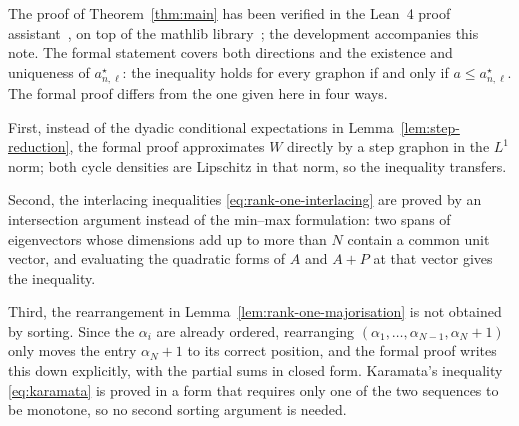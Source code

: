 \documentclass[11pt]{article}
\theoremstyle{definition}
\theoremstyle{remark}
\begin{document}
The proof of Theorem~\ref{thm:main} has been verified in the Lean~4
proof assistant~\cite{Lean4}, on top of the mathlib
library~\cite{mathlib}; the development accompanies this note.  The
formal statement covers both directions and the existence and
uniqueness of $a_{n,\ell}^{\star}$: the inequality holds for every graphon
if and only if $a\le a_{n,\ell}^{\star}$.  The formal proof differs from
the one given here in four ways.

First, instead of the dyadic conditional expectations in
Lemma~\ref{lem:step-reduction}, the formal proof approximates $W$
directly by a step graphon in the $L^1$ norm; both cycle densities
are Lipschitz in that norm, so the inequality transfers.

Second, the interlacing inequalities \eqref{eq:rank-one-interlacing}
are proved by an intersection argument instead of the min--max
formulation: two spans of eigenvectors whose
dimensions add up to more than $N$ contain a common unit vector, and
evaluating the quadratic forms of $A$ and $A+P$ at that vector gives
the inequality.

Third, the rearrangement in Lemma~\ref{lem:rank-one-majorisation} is
not obtained by sorting.  Since the $\alpha_i$ are already ordered,
rearranging $(\alpha_1,\ldots,\alpha_{N-1},\alpha_N+1)$ only moves
the entry $\alpha_N+1$ to its correct position, and the formal proof
writes this down explicitly, with the partial sums in closed form.
Karamata's inequality \eqref{eq:karamata} is proved in a form that
requires only one of the two sequences to be monotone, so no second
sorting argument is needed.
\end{document}
